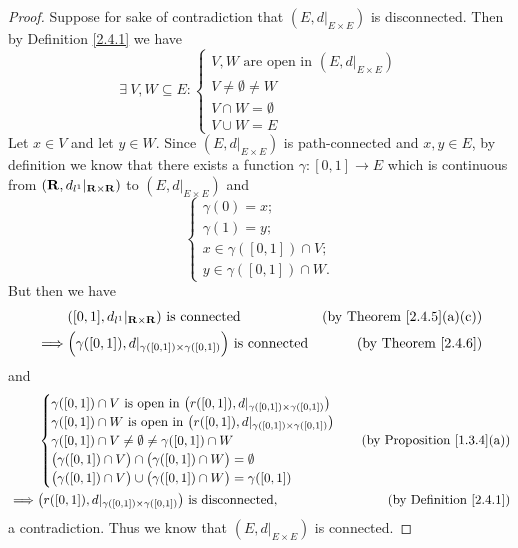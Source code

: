 \begin{proof}
    Suppose for sake of contradiction that \((E, d|_{E \times E})\) is disconnected.
    Then by Definition \ref{2.4.1} we have
    \[
        \exists\ V, W \subseteq E : \begin{cases}
            V, W \text{ are open in } (E, d|_{E \times E}) \\
            V \neq \emptyset \neq W                        \\
            V \cap W = \emptyset                           \\
            V \cup W = E
        \end{cases}
    \]
    Let \(x \in V\) and let \(y \in W\).
    Since \((E, d|_{E \times E})\) is path-connected and \(x, y \in E\), by definition we know that there exists a function \(\gamma : [0, 1] \to E\) which is continuous from \((\mathbf{R}, d_{l^1}|_{\mathbf{R} \times \mathbf{R}})\) to \((E, d|_{E \times E})\) and
    \[
        \begin{cases}
            \gamma(0) = x;               \\
            \gamma(1) = y;               \\
            x \in \gamma([0, 1]) \cap V; \\
            y \in \gamma([0, 1]) \cap W.
        \end{cases}
    \]
    But then we have
    \begin{align*}
                 & ([0, 1], d_{l^1}|_{\mathbf{R} \times \mathbf{R}}) \text{ is connected}                                   & \text{(by Theorem \ref{2.4.5}(a)(c))} \\
        \implies & \Big(\gamma([0, 1]), d|_{\gamma([0, 1]) \times \gamma([0, 1])}\Big) \text{ is connected} & \text{(by Theorem \ref{2.4.6})}
    \end{align*}
    and
    \begin{align*}
                 & \begin{cases}
                       \gamma([0, 1]) \cap V \text{ is open in } \big(r([0, 1]), d|_{\gamma([0, 1]) \times \gamma([0, 1])}\big) \\
                       \gamma([0, 1]) \cap W \text{ is open in } \big(r([0, 1]), d|_{\gamma([0, 1]) \times \gamma([0, 1])}\big) \\
                       \gamma([0, 1]) \cap V \neq \emptyset \neq \gamma([0, 1]) \cap W                                          \\
                       \big(\gamma([0, 1]) \cap V\big) \cap \big(\gamma([0, 1]) \cap W\big) = \emptyset                         \\
                       \big(\gamma([0, 1]) \cap V\big) \cup \big(\gamma([0, 1]) \cap W\big) = \gamma([0, 1])
                   \end{cases} & \text{(by Proposition \ref{1.3.4}(a))}                                         \\
        \implies & \big(r([0, 1]), d|_{\gamma([0, 1]) \times \gamma([0, 1])}\big) \text{ is disconnected},                                     & \text{(by Definition \ref{2.4.1})}
    \end{align*}
    a contradiction.
    Thus we know that \((E, d|_{E \times E})\) is connected.
\end{proof}

